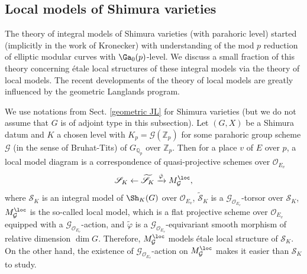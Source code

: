 \documentclass[11pt]{amsart}
\theoremstyle{definition}
\theoremstyle{definition}
\theoremstyle{definition}
\numberwithin{equation}{section}
\newcommand{\bQ}{{\mathbb Q}}
\newcommand{\bZ}{{\mathbb Z}}
\newcommand{\mG}{{\mathcal G}}
\newcommand{\mO}{{\mathcal O}}
\newcommand{\scrS}{{\mathscr S}}
\begin{document}
\subsection{Local models of Shimura varieties}\label{S: local model}
The theory of integral models of Shimura varieties (with parahoric level) started (implicitly in the work of Kronecker) with understanding of the mod $p$ reduction of elliptic modular curves with $\Ga_0(p)$-level. We discuss a small fraction of this theory concerning \'{e}tale local structures of these integral models via the theory of local models. The recent developments of the theory of local models are greatly influenced by the geometric Langlands program.

We use notations from Sect. \ref{geometric JL} for Shimura varieties (but we do not assume that $G$ is of adjoint type in this subsection). Let $(G,X)$ be a Shimura datum and $K$ a chosen level with $K_p=\mG(\bZ_p)$ for some parahoric group scheme $\mG$ (in the sense of Bruhat-Tits) of $G_{\bQ_p}$ over $\bZ_p$. Then for a place $v$ of $E$ over $p$, a local model diagram is a correspondence of quasi-projective schemes over $\mO_{E_v}$
\begin{equation}\label{E: local model diagram}
\scrS_K\leftarrow\widetilde{\scrS}_K\xrightarrow{\tilde\varphi} M^{\loc}_{\mG},
\end{equation}
where $\scrS_K$ is an integral model of $\Sh_K(G)$ over $\mO_{E_v}$, $\widetilde{\scrS}_K$ is a $\mG_{\mO_{E_v}}$-torsor over $\scrS_K$, $M^{\loc}_{\mG}$ is the so-called local model, which is a flat projective scheme over $\mO_{E_v}$ equipped with a $\mG_{\mO_{E_v}}$-action, and $\tilde{\varphi}$ is a $\mG_{\mO_{E_v}}$-equivariant smooth morphism of relative dimension $\dim G$.
Therefore, $M_{\mG}^{\loc}$ models \'{e}tale local structure of $\scrS_K$. On the other hand, the existence of $\mG_{\mO_{E_v}}$-action on $M_{\mG}^\loc$ makes it easier than $\scrS_K$ to study. 
\end{document}
